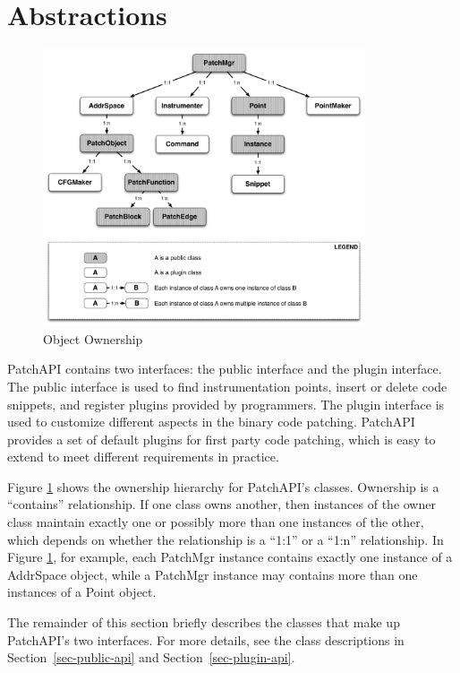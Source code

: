 \section{Abstractions}
\label{sec-abs}

\begin{figure}[ht!]
\centerline{\includegraphics[width=0.85\textwidth]{./figure/abstraction/img.pdf}}
\caption{\label{fig:abs}Object Ownership}
\end{figure}


PatchAPI contains two interfaces: the public interface and the plugin interface.
The public interface is used to find instrumentation points, insert or delete
code snippets, and register plugins provided by programmers. The plugin
interface is used to customize different aspects in the binary code patching.
PatchAPI provides a set of default plugins for first party code patching, which
is easy to extend to meet different requirements in practice.

Figure \ref{fig:abs} shows the ownership hierarchy for PatchAPI's classes.
Ownership is a ``contains'' relationship. If one class owns another, then
instances of the owner class maintain exactly one or possibly more than one
instances of the other, which depends on whether the relationship is a ``1:1''
or a ``1:n'' relationship. In Figure \ref{fig:abs}, for example, each PatchMgr
instance contains exactly one instance of a AddrSpace object, while a PatchMgr
instance may contains more than one instances of a Point object.

The remainder of this section briefly describes the classes that make up
PatchAPI's two interfaces. For more details, see the class descriptions in
Section~\ref{sec-public-api} and Section~\ref{sec-plugin-api}.

